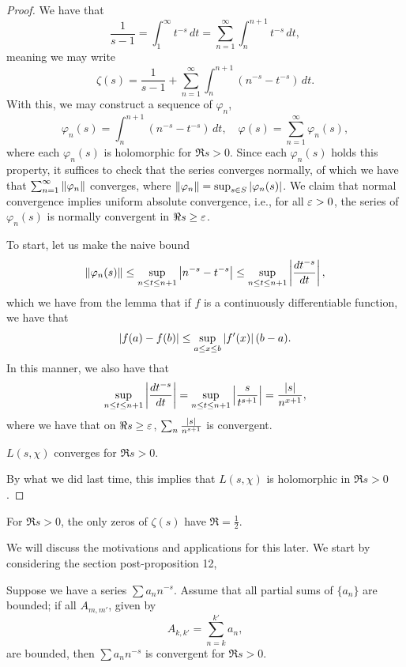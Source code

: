 \begin{proof}
    We have that
    \[ \frac{1}{s-1} = \int_1^\infty t^{-s} \, dt = \sum_{n=1}^\infty \int_{n}^{n+1} t^{-s} \, dt, \]
    meaning we may write
    \[ \zeta(s) = \frac{1}{s-1} + \sum_{n=1}^\infty \int_n^{n+1} \left(n^{-s} - t^{-s}\right) \, dt. \]
    With this, we may construct a sequence of $\varphi_n$,
    \[ \varphi_n(s) = \int_n^{n+1} \left(n^{-s} - t^{-s}\right) \, dt, \quad \varphi(s) = \sum_{n=1}^\infty \varphi_n(s), \]
    where each $\varphi_n(s)$ is holomorphic for $\Re s > 0$. Since each $\varphi_n(s)$ holds this property, it suffices to check that the series converges normally, of which we have that $\sum_{n=1}^\infty \left\lVert \varphi_n \right\rVert$ converges, where $\left\lVert \varphi_n \right\rVert = \sup_{s \in S} \left\lvert \varphi_n(s) \right\rvert$. We claim that normal convergence implies uniform absolute convergence, i.e., for all $\varepsilon > 0$, the series of $\varphi_n(s)$ is normally convergent in $\Re s \geq \varepsilon$.
    \begin{subproof}
        To start, let us make the naive bound
        \[ \left\lVert \varphi_n(s) \right\rVert \leq \sup_{n \leq t \leq n + 1} \left\lvert n^{-s} - t^{-s} \right\rvert \leq \sup_{n \leq t \leq n + 1} \left\lvert \frac{dt^{-s}}{dt} \right\rvert, \]
        which we have from the lemma that if $f$ is a continuously differentiable function, we have that
        \[ \left\lvert f(a) - f(b) \right\rvert \leq \sup_{a \leq x \leq b} \left\lvert f'(x) \right\rvert (b - a). \]
        In this manner, we also have that
        \[ \sup_{n \leq t \leq n + 1} \left\lvert \frac{dt^{-s}}{dt} \right\rvert = \sup_{n \leq t \leq n+1} \left\lvert \frac{s}{t^{s+1}} \right\rvert = \frac{\left\lvert s \right\rvert}{n^{x+1}}, \]
        where we have that on $\Re s \geq \varepsilon$, $\sum_n \frac{\left\lvert s \right\rvert}{n^{s+1}}$ is convergent.
    \end{subproof}
    \begin{claim}
        $L(s, \chi)$ converges for $\Re s > 0$.
    \end{claim}
    \noindent By what we did last time, this implies that $L(s, \chi)$ is holomorphic in $\Re s > 0$.
\end{proof}
\begin{conjecture}
    For $\Re s > 0$, the only zeros of $\zeta(s)$ have $\Re = \frac{1}{2}$.
\end{conjecture}
\noindent We will discuss the motivations and applications for this later. We start by considering the section post-proposition 12, 
\begin{lemma}[Proposition 9]
    Suppose we have a series $\sum a_n n^{-s}$. Assume that all partial sums of $\{a_n\}$ are bounded; if all $A_{m,m'}$, given by
    \[ A_{k,k'} = \sum_{n=k}^{k'} a_n, \]
    are bounded, then $\sum a_n n^{-s}$ is convergent for $\Re s > 0$.
\end{lemma}
